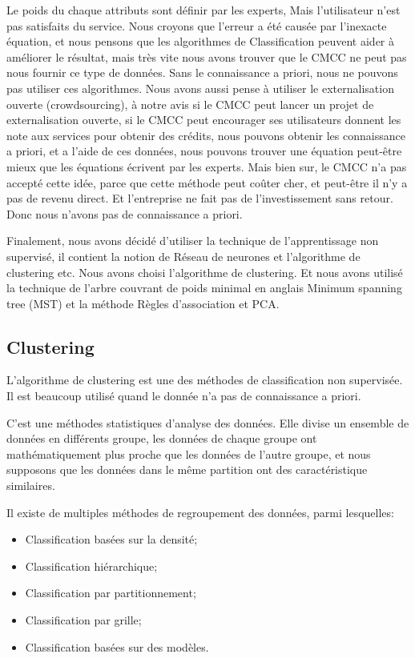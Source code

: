Le poids du chaque attributs sont définir par les experts, Mais l'utilisateur n'est pas satisfaits du service. Nous croyons que l'erreur a été causée par l'inexacte équation, et nous pensons que les algorithmes de Classification peuvent aider à améliorer le résultat, mais très vite nous avons trouver que le CMCC ne peut pas nous fournir ce type de données. Sans le connaissance a priori, nous ne pouvons pas utiliser ces algorithmes. Nous avons aussi pense à utiliser le externalisation ouverte (crowdsourcing), à notre avis si le CMCC peut lancer un projet de externalisation ouverte, si le CMCC peut encourager ses utilisateurs donnent les note aux services pour obtenir des crédits, nous pouvons obtenir les connaissance a priori, et a l'aide de ces données, nous pouvons trouver une équation peut-être mieux que les équations écrivent par les experts. Mais bien sur, le CMCC n'a pas accepté cette idée, parce que cette méthode peut coûter cher, et peut-être il n'y a pas de revenu direct. Et l'entreprise ne fait pas de l'investissement sans retour. Donc nous n'avons pas de connaissance a priori.

Finalement, nous avons décidé d'utiliser la technique de l'apprentissage non supervisé, il contient la notion de Réseau de neurones et l'algorithme de clustering etc. Nous avons choisi l'algorithme de clustering. Et nous avons utilisé la technique de l'arbre couvrant de poids minimal en anglais Minimum spanning tree \textsf{(MST)} et la méthode \textsf{Règles d'association} et \textsf{PCA}.

\subsection{Clustering}
L'algorithme de clustering est une des méthodes de classification non supervisée. Il est beaucoup utilisé quand le donnée n'a pas de connaissance a priori.

C'est une méthodes statistiques d'analyse des données. Elle divise un ensemble de données en différents groupe, les données de chaque groupe ont mathématiquement plus proche que les données de l'autre groupe,  et nous supposons que les données dans le même partition ont des caractéristique similaires.

Il existe de multiples méthodes de regroupement des données, parmi lesquelles:
\begin{itemize}
\item Classification basées sur la densité;
\item Classification hiérarchique;
\item Classification par partitionnement;
\item Classification par grille;
\item Classification basées sur des modèles.
\end{itemize}
\vspace{1ex}

